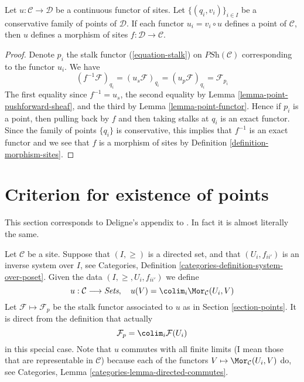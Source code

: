 \begin{lemma}
\label{lemma-check-morphism-sites}
Let $u : \mathcal{C} \to \mathcal{D}$ be a continuous functor of sites.
Let $\{(q_i, v_i)\}_{i\in I}$ be a conservative family of points of
$\mathcal{D}$. If each functor $u_i = v_i \circ u$ defines
a point of $\mathcal{C}$,
then $u$ defines a morphism of sites $f : \mathcal{D} \to \mathcal{C}$.
\end{lemma}

\begin{proof}
Denote $p_i$ the stalk functor (\ref{equation-stalk}) on
$\textit{PSh}(\mathcal{C})$ corresponding to the functor $u_i$. We have
$$
(f^{-1}\mathcal{F})_{q_i} =
(u_s\mathcal{F})_{q_i} =
(u_p\mathcal{F})_{q_i} =
\mathcal{F}_{p_i}
$$
The first equality since $f^{-1} = u_s$, the second equality
by Lemma \ref{lemma-point-pushforward-sheaf}, and the third
by Lemma \ref{lemma-point-functor}.
Hence if $p_i$ is a point, then pulling back by $f$
and then taking stalks at $q_i$ is an exact functor.
Since the family of points $\{q_i\}$ is conservative, this
implies that $f^{-1}$ is an exact functor and we see
that $f$ is a morphism of sites by Definition \ref{definition-morphism-sites}.
\end{proof}





\section{Criterion for existence of points}
\label{section-criterion-points}

\noindent
This section corresponds to Deligne's appendix to \cite[Expos\'e VI]{SGA4}.
In fact it is almost literally the same.

\medskip\noindent
Let $\mathcal{C}$ be a site.
Suppose that $(I, \geq)$ is a directed set,
and that $(U_i, f_{ii'})$ is an inverse system over $I$, see
Categories, Definition \ref{categories-definition-system-over-poset}.
Given the data $(I, \geq, U_i, f_{ii'})$ we define
$$
u : \mathcal{C} \longrightarrow \textit{Sets}, \quad
u(V) = \colim_i \Mor_\mathcal{C}(U_i , V)
$$
Let $\mathcal{F} \mapsto \mathcal{F}_p$ be the stalk functor
associated to $u$ as in Section \ref{section-points}.
It is direct from the definition that actually
$$
\mathcal{F}_p = \colim_i \mathcal{F}(U_i)
$$
in this special case.
Note that $u$ commutes with all finite limits (I mean those that
are representable in $\mathcal{C}$) because
each of the functors $V \mapsto \Mor_\mathcal{C}(U_i , V)$
do, see Categories, Lemma \ref{categories-lemma-directed-commutes}.

